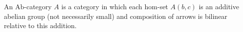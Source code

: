 An $\text{Ab}$-category $A$ is a category in which each hom-set $A(b,c)$ is an additive abelian group (not necessarily small) and composition of arrows is bilinear relative to this addition.
